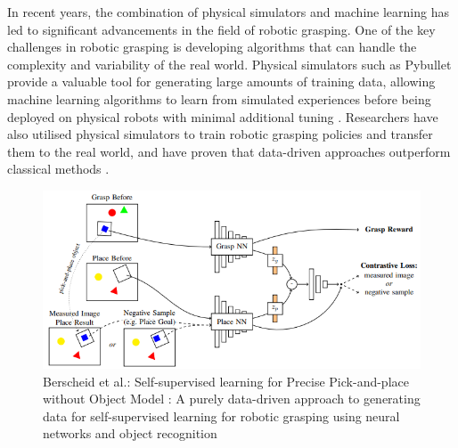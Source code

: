 \documentclass[11pt, a4paper]{report}
\begin{document}
In recent years, the combination of physical simulators and machine learning has led to significant advancements in the field of robotic grasping. One of the key challenges in robotic grasping is developing algorithms that can handle the complexity and variability of the real world. Physical simulators such as Pybullet \cite{coumans2021} provide a valuable tool for generating large amounts of training data, allowing machine learning algorithms to learn from simulated experiences before being deployed on physical robots with minimal additional tuning \cite{berscheid2020selfsupervised}. Researchers have also utilised physical simulators to train robotic grasping policies \cite{Chebotar_2017} and transfer them to the real world, and have proven that data-driven approaches outperform classical methods \cite{zhang2022robotic}.
\begin{figure}[ht]
    \centering
    \includegraphics[width=\textwidth]{docs/Project Report/Media/berscheid_2020_sl_for_precise_pickandplace_wo_obj_model_network.png}
    \caption{Berscheid et al.: Self-supervised learning for Precise Pick-and-place without Object Model \cite{berscheid2020selfsupervised}: A purely data-driven approach to generating data for self-supervised learning for robotic grasping using neural networks and object recognition}
    \label{fig:1.1}
\end{figure}
\end{document}
